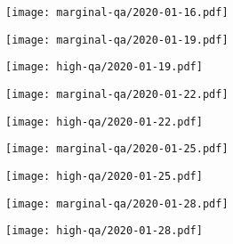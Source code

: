 \documentclass{article}
\begin{document}
\begin{figure}[H]
	\ContinuedFloat
	\centering
	\begin{subfigure}{\linewidth}
		\texttt{[image: marginal-qa/2020-01-16.pdf]}
	\end{subfigure}
	\begin{subfigure}{0.48\linewidth}
		\texttt{[image: marginal-qa/2020-01-19.pdf]}
	\end{subfigure}
	\begin{subfigure}{0.48\linewidth}
		\texttt{[image: high-qa/2020-01-19.pdf]}
	\end{subfigure}
	\begin{subfigure}{0.48\linewidth}
		\texttt{[image: marginal-qa/2020-01-22.pdf]}
	\end{subfigure}
	\begin{subfigure}{0.48\linewidth}
		\texttt{[image: high-qa/2020-01-22.pdf]}
	\end{subfigure}
	\begin{subfigure}{0.48\linewidth}
		\texttt{[image: marginal-qa/2020-01-25.pdf]}
	\end{subfigure}
	\begin{subfigure}{0.48\linewidth}
		\texttt{[image: high-qa/2020-01-25.pdf]}
	\end{subfigure}
	\begin{subfigure}{0.48\linewidth}
		\texttt{[image: marginal-qa/2020-01-28.pdf]}
	\end{subfigure}
	\begin{subfigure}{0.48\linewidth}
		\texttt{[image: high-qa/2020-01-28.pdf]}
	\end{subfigure}
\end{figure}
\end{document}
